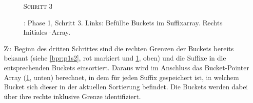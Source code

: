 \begin{figure}[H]
    {\centering\begin{minipage}{\textwidth}
        {\large \textsc{Schritt 3}}\par\medskip
    \end{minipage}}
    \caption[\bpr: Phase 1, Schritt 3]{\bpr: Phase 1, Schritt 3. Links: Befüllte Buckets im Suffixarray. Rechts Initiales \bptr-Array.}
    \label{bpr:p1s3}
\end{figure}
Zu Beginn des dritten Schrittes sind die rechten Grenzen der Buckets bereits bekannt (siehe \cref{bpr:p1s2}, rot markiert und \cref{bpr:p1s3}, oben) und die Suffixe in die entsprechenden Buckets einsortiert. Daraus wird im Anschluss das Bucket-Pointer Array (\cref{bpr:p1s3}, unten) berechnet, in dem für jeden Suffix gespeichert ist, in welchem Bucket sich dieser in der aktuellen Sortierung befindet. Die Buckets werden dabei über ihre rechte inklusive Grenze identifiziert.\par
